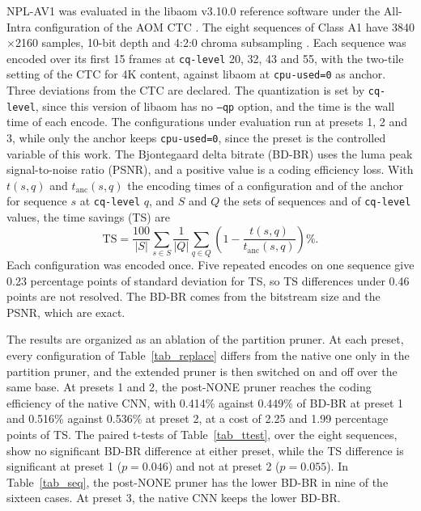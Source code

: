 \documentclass[conference]{IEEEtran}
\begin{document}
NPL-AV1 was evaluated in the libaom v3.10.0 reference software under the
All-Intra configuration of the AOM CTC \cite{ctc}. The eight sequences of Class
A1 have 3840$\times$2160 samples, 10-bit depth and 4:2:0 chroma subsampling
\cite{xipha1}. Each sequence was encoded over its first 15 frames at
\texttt{cq-level} 20, 32, 43 and 55, with the two-tile setting of the CTC for 4K content, against
libaom at \texttt{cpu-used=0} as anchor. Three deviations from the CTC are
declared. The quantization is set by \texttt{cq-level}, since this version of
libaom has no \texttt{--qp} option, and the time is the wall time of each
encode. The configurations under evaluation run at presets 1, 2 and 3, while
only the anchor keeps \texttt{cpu-used=0}, since the preset is the controlled
variable of this work. The Bjontegaard delta bitrate (BD-BR) \cite{bjontegaard}
uses the luma peak signal-to-noise ratio (PSNR), and a
positive value is a coding efficiency loss. With $t(s,q)$ and
$t_{\mathrm{anc}}(s,q)$ the encoding times of a configuration and of the anchor
for sequence $s$ at \texttt{cq-level} $q$, and $S$ and $Q$ the sets of sequences
and of \texttt{cq-level} values, the time savings (TS) are
\begin{equation}
\mathrm{TS} = \frac{100}{|S|} \sum_{s \in S} \frac{1}{|Q|} \sum_{q \in Q}
\left( 1 - \frac{t(s,q)}{t_{\mathrm{anc}}(s,q)} \right) \%.
\label{eq_ts}
\end{equation}
Each configuration was encoded once. Five repeated encodes on one sequence give
0.23 percentage points of standard deviation for TS, so TS differences under 0.46
points are not resolved. The BD-BR comes from the bitstream size and the PSNR,
which are exact.

The results are organized as an ablation of the partition pruner. At each
preset, every configuration of Table~\ref{tab_replace} differs from the native
one only in the partition pruner, and the extended pruner is then switched on
and off over the same base. At presets 1 and 2, the post-NONE pruner reaches the
coding efficiency of the native CNN, with 0.414\% against 0.449\% of BD-BR at
preset 1 and 0.516\% against 0.536\% at preset 2, at a cost of 2.25 and 1.99
percentage points of TS. The paired t-tests of Table~\ref{tab_ttest}, over the
eight sequences, show no significant BD-BR difference at either preset, while the
TS difference is significant at preset 1 ($p = 0.046$) and not at preset 2
($p = 0.055$). In Table~\ref{tab_seq}, the post-NONE pruner has the lower BD-BR in nine of the
sixteen cases. At preset
3, the native CNN keeps the lower BD-BR.
\end{document}
